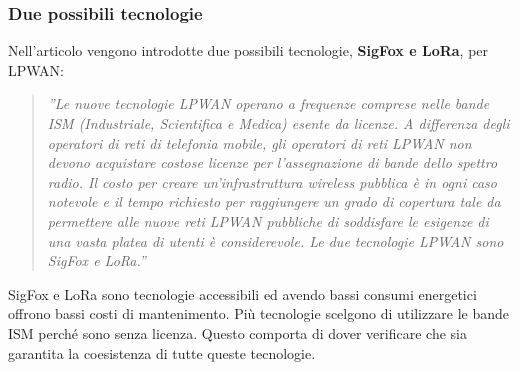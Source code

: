 \documentclass[a4paper]{report} %
\begin{document}
\subsubsection{Due possibili tecnologie}
Nell'articolo \cite{art:rif.23} vengono introdotte due possibili tecnologie, \textbf{SigFox e LoRa}, per LPWAN: 
\begin{quote}
	\textit{''Le nuove tecnologie LPWAN operano a frequenze comprese nelle bande ISM (Industriale, Scientifica e Medica) esente da licenze. A differenza degli operatori di reti di telefonia mobile, gli operatori di reti LPWAN non devono acquistare costose licenze per l'assegnazione di bande dello spettro radio. Il costo per creare un'infrastruttura wireless pubblica è in ogni caso notevole e il tempo richiesto per raggiungere un grado di copertura tale da permettere alle nuove reti LPWAN pubbliche di soddisfare le esigenze di una vasta platea di utenti è considerevole. Le due tecnologie LPWAN sono SigFox e LoRa.''}
\end{quote}
SigFox e LoRa sono tecnologie accessibili ed avendo bassi consumi energetici offrono bassi costi di mantenimento. Più tecnologie scelgono di utilizzare le bande ISM perché sono senza licenza. Questo comporta di dover verificare che sia garantita la coesistenza di tutte queste tecnologie.
\end{document}
